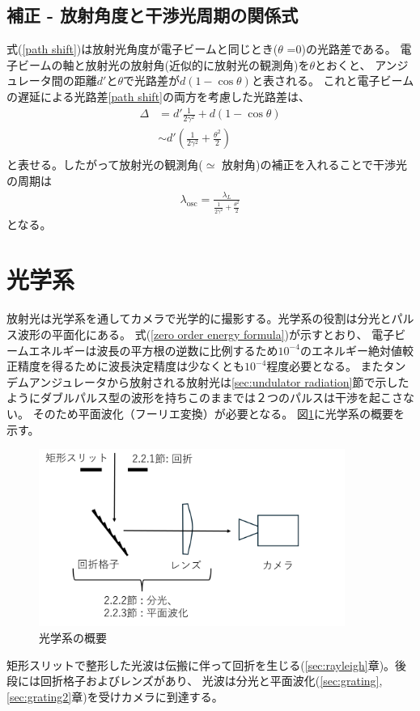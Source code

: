 \documentclass[a4paper,11pt,uplatex]{jsbook}
\begin{document}
\subsection{補正 - 放射角度と干渉光周期の関係式}
式(\ref*{path shift})は放射光角度が電子ビームと同じとき($\theta$ =0)の光路差である。
電子ビームの軸と放射光の放射角(近似的に放射光の観測角)を$\theta$とおくと、
アンジュレータ間の距離$d'$と$\theta$で光路差が$d(1-\cos{\theta})$と表される。
これと電子ビームの遅延による光路差\ref{path shift}の両方を考慮した光路差は、
\begin{eqnarray}
  \Delta &= d'\frac{1}{2\gamma^2} + d(1 - \cos{\theta}) \\
        &\sim d'(\frac{1}{2\gamma^2} + \frac{\theta^2}{2})\\
\end{eqnarray}
と表せる。したがって放射光の観測角($\simeq$ 放射角)の補正を入れることで干渉光の周期は
\begin{eqnarray}
  \lambda_{\text{osc}} = \frac{\lambda_L}{\frac{1}{2\gamma^2} + \frac{\theta^2}{2}}
\end{eqnarray}
となる。



\section{光学系}\label{sec:optics}
放射光は光学系を通してカメラで光学的に撮影する。光学系の役割は分光とパルス波形の平面化にある。
式(\ref{zero order energy formula})が示すとおり、
電子ビームエネルギーは波長の平方根の逆数に比例するため$10^{-4}$のエネルギー絶対値較正精度を得るために波長決定精度は少なくとも$10^{-4}$程度必要となる。
またタンデムアンジュレータから放射される放射光は\ref{sec:undulator radiation}節で示したようにダブルパルス型の波形を持ちこのままでは２つのパルスは干渉を起こさない。
そのため平面波化（フーリエ変換）が必要となる。
図\ref{optics_schematic}に光学系の概要を示す。
\begin{figure}[h]
  \centering
  \includegraphics[width=10cm]{image/2-opticsshematic.png}
  \caption{光学系の概要}
  \label{optics_schematic}
\end{figure}
矩形スリットで整形した光波は伝搬に伴って回折を生じる(\ref{sec:rayleigh}章)。後段には回折格子およびレンズがあり、
光波は分光と平面波化(\ref{sec:grating}, \ref{sec:grating2}章)を受けカメラに到達する。
\end{document}
